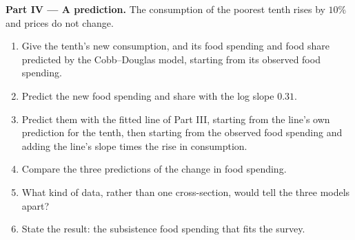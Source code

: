 \begin{problem}
\medskip\noindent\textbf{Part IV --- A prediction.} The consumption of the
poorest tenth rises by $10\%$ and prices do not change.
\begin{enumerate}[resume]
  \item Give the tenth's new consumption, and its food spending and food share predicted by the Cobb--Douglas model, starting from its observed food spending.
  \item Predict the new food spending and share with the log slope $0.31$.
  \item Predict them with the fitted line of Part III, starting from the line's own prediction for the tenth, then starting from the observed food spending and adding the line's slope times the rise in consumption.
  \item Compare the three predictions of the change in food spending.
  \item What kind of data, rather than one cross-section, would tell the three models apart?
  \item State the result: the subsistence food spending that fits the survey.
\end{enumerate}
\end{problem}

